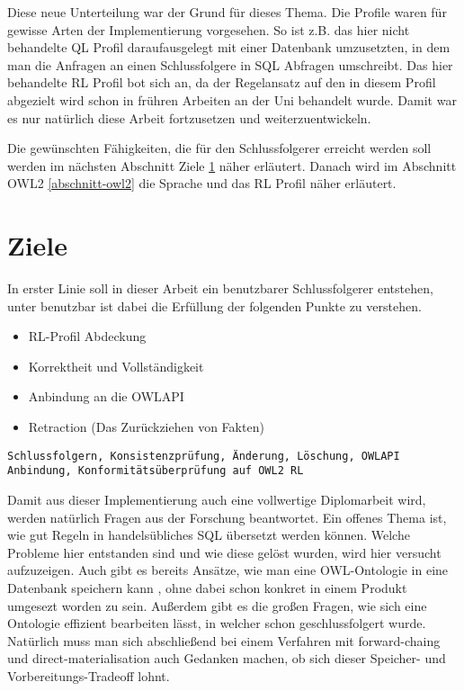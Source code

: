 Diese neue Unterteilung war der Grund für dieses Thema. Die Profile waren für gewisse Arten der Implementierung vorgesehen. So ist z.B. das hier nicht behandelte QL Profil daraufausgelegt mit einer Datenbank umzusetzten, in dem man die Anfragen an einen Schlussfolgere in SQL Abfragen umschreibt. Das hier behandelte RL Profil bot sich an, da der Regelansatz auf den in diesem Profil abgezielt wird schon in frühren Arbeiten an der Uni behandelt wurde. Damit war es nur natürlich diese Arbeit fortzusetzen und weiterzuentwickeln.

Die gewünschten Fähigkeiten, die für den Schlussfolgerer erreicht werden soll werden im nächsten Abschnitt Ziele \ref{abschnitt-ziele} näher erläutert. Danach wird im Abschnitt OWL2 \ref{abschnitt-owl2} die Sprache und das RL Profil näher erläutert.

\section{Ziele}
\label{abschnitt-ziele}

In erster Linie soll in dieser Arbeit ein benutzbarer Schlussfolgerer entstehen, unter benutzbar ist dabei die Erfüllung der folgenden Punkte zu verstehen.

\begin{itemize}
  \item RL-Profil Abdeckung
  \item Korrektheit und Vollständigkeit
  \item Anbindung an die OWLAPI
  \item Retraction (Das Zurückziehen von Fakten)
\end{itemize}
\begin{verbatim}
Schlussfolgern, Konsistenzprüfung, Änderung, Löschung, OWLAPI Anbindung, Konformitätsüberprüfung auf OWL2 RL
\end{verbatim}

Damit aus dieser Implementierung auch eine vollwertige Diplomarbeit wird, werden natürlich Fragen aus der Forschung beantwortet. Ein offenes Thema ist, wie gut Regeln in handelsübliches SQL übersetzt werden können. Welche Probleme hier entstanden sind und wie diese gelöst wurden, wird hier versucht aufzuzeigen. Auch gibt es bereits Ansätze, wie man eine OWL-Ontologie in eine Datenbank speichern kann \cite{Kleb2009OWLDB}, ohne dabei schon konkret in einem Produkt umgesezt worden zu sein. Außerdem gibt es die großen Fragen, wie sich eine Ontologie effizient bearbeiten lässt, in welcher schon geschlussfolgert wurde. Natürlich muss man sich abschließend bei einem Verfahren mit forward-chaing und direct-materialisation auch Gedanken machen, ob sich dieser Speicher- und Vorbereitungs-Tradeoff lohnt.

